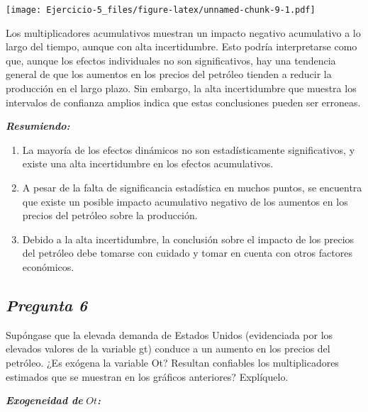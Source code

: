 \documentclass[
  12pt,
]{article}
\begin{document}
\texttt{[image: Ejercicio-5\_files/figure-latex/unnamed-chunk-9-1.pdf]}

Los multiplicadores acumulativos muestran un impacto negativo
acumulativo a lo largo del tiempo, aunque con alta incertidumbre. Esto
podría interpretarse como que, aunque los efectos individuales no son
significativos, hay una tendencia general de que los aumentos en los
precios del petróleo tienden a reducir la producción en el largo plazo.
Sin embargo, la alta incertidumbre que muestra los intervalos de
confianza amplios indica que estas conclusiones pueden ser erroneas.

\textbf{\emph{Resumiendo:}}

\begin{enumerate}
\def\labelenumi{\arabic{enumi}.}
\item
  La mayoría de los efectos dinámicos no son estadísticamente
  significativos, y existe una alta incertidumbre en los efectos
  acumulativos.
\item
  A pesar de la falta de significancia estadística en muchos puntos, se
  encuentra que existe un posible impacto acumulativo negativo de los
  aumentos en los precios del petróleo sobre la producción.
\item
  Debido a la alta incertidumbre, la conclusión sobre el impacto de los
  precios del petróleo debe tomarse con cuidado y tomar en cuenta con
  otros factores económicos. \newpage
\end{enumerate}

\subsection{\texorpdfstring{\textbf{\emph{Pregunta
6}}}{Pregunta 6}}\label{pregunta-6}

Supóngase que la elevada demanda de Estados Unidos (evidenciada por los
elevados valores de la variable gt) conduce a un aumento en los precios
del petróleo. ¿Es exógena la variable Ot? Resultan confiables los
multiplicadores estimados que se muestran en los gráficos anteriores?
Explíquelo.

\textbf{\emph{Exogeneidad de}} \(Ot\)\textbf{\emph{:}}
\end{document}
